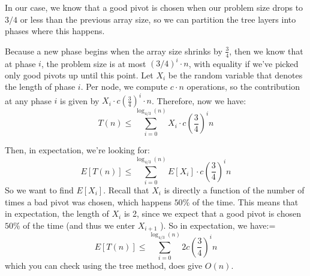 \begin{itemize}
		In our case, 
		we know that a good pivot is chosen when our problem size drops to \( 3 /4 \) or less than the previous array size, 
		so we can partition the tree layers into phases where this happens. 

		Because a new phase begins when the array size shrinks by \( \frac{3}{4} \), then we know that at phase \( i \), 
		the problem size is at most \( (3 / 4)^{i} \cdot n \), with equality if we've picked only good pivots up until this point.
		Let \( X_i \) be the random variable that denotes the length of phase \( i \). Per node, we compute 
		\( c \cdot n \) operations, so the contribution at any phase \( i \) is given by 
		\( X_i \cdot c\left( \frac{3}{4} \right) ^{i} \cdot n \). Therefore, now we have:
		\[
			T(n) \le  \sum_{i = 0}^{\log_{4 / 3}(n)}X_i \cdot c\left( \frac{3}{4} \right) ^{i}n
		\] 

		Then, in expectation, we're looking for:
		\[
			E[T(n)] \le  \sum_{i = 0}^{\log_{4 / 3}(n)}E[X_i] \cdot c \left( \frac{3}{4} \right) ^{i}n
		\] 
		So we want to find \( E[X_i] \). Recall that \( X_i \) is directly a function of the number of times a bad pivot 
		was chosen, which happens \( 50\% \) of the time. This means that in expectation, the length of \( X_i \) is 2, 
		since we expect that a good pivot is chosen \( 50\% \) of the time (and thus we enter \( X_{i+1} \) ). So in expectation, 
		we have:=
		\[
			E[T(n)] \le \sum_{i = 0}^{\log_{4 / 3}(n)} 2 c\left( \frac{3}{4} \right) ^{i} n
		\] 
		which you can check using the tree method, does give \( O(n) \). 
\end{itemize}
